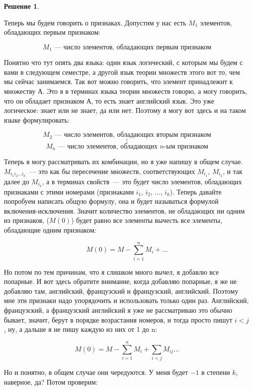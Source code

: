 \documentclass[russian]{lecture-notes}
\theoremstyle{definition}
\newtheorem*{solution}{Решение}
\begin{document}
\begin{enumerate}
\begin{solution}
		\end{solution}
	
		Теперь мы будем говорить о признаках. Допустим у нас есть $M_1$ элементов, обладающих первым признаком:
		
		\[
			M_1 \text{~--- число элементов, обладающих первым признаком}
		\]
		
		Понятно что тут опять два языка: один язык логический, с которым мы будем с вами в следующем семестре, а другой язык теории множеств этого вот то, чем мы сейчас занимаемся. Так вот можно говорить, что элемент принадлежит к множеству А. Это я в терминах языка теории множеств говорю, а могу говорить, что он обладает признаком А, то есть знает английский язык. Это уже логическое: знает или не знает, да или нет. Поэтому я могу вот здесь и на таком языке формулировать: 
		
		\[
			M_2 \text{~--- число элементов, обладающих вторым признаком}
		\]
		\[
			\vdots
		\]
		\[
			M_n \text{~--- число элементов, обладающих $n$-ым признаком}
		\]
		
		Теперь я могу рассматривать их комбинации, но я уже напишу в общем случае. $M_{i_1i_2...i_k}$~--- это как бы пересечение множеств, соответствующих $M_{i_1}$, $M_{i_2}$, и так далее до $M_{i_k}$, а в терминах свойств~--- это будет число элементов, обладающих признаками с этими номерами (признаками $i_1$, $i_2$, $\ldots$, $i_k$). Теперь давайте попробуем написать общую формулу, она и будет называться формулой включения-исключения. Значит количество элементов, не обладающих ни одним из признаков, ($M(0)$) будет равно все элементы вычесть все элементы, обладающие одним признаком:
		
		\[
			M(0) = M - \sum_{i=1}^{n}M_i + \ldots
		\]
		
		Но потом по тем причинам, что я слишком много вычел, я добавлю все попарные. И вот здесь обратите внимание, когда добавляю попарные, я же не добавляю там, английский, французский и французский, английский. Поэтому мне эти признаки надо упорядочить и использовать только один раз. Английский, французский, а французский английский я уже не рассматриваю это обычно бывает, значит, берут в порядке возрастания номеров, и тогда просто пишут $i < j$, ну, а дальше я не пишу каждую из них от 1 до n:
		
		\[
			M(0) = M - \sum_{i=1}^{n}M_i + \sum_{i<j}M_{ij} \ldots
		\]
		
		Но и понятно, в общем случае они чередуются. У меня будет $-1$ в степени $k$, наверное, да? Потом проверим:
		

\end{enumerate}
\end{document}
